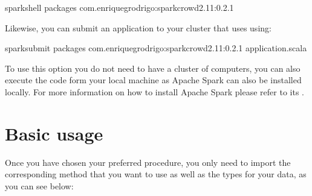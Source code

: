 \documentclass[letterpaper,10pt,english]{sphinxmanual}
\begin{document}
%
\begin{sphinxVerbatim}[commandchars=\\\{\}]
spark\PYGZhy{}shell \PYGZhy{}\PYGZhy{}packages com.enriquegrodrigo:spark\PYGZhy{}crowd\PYGZus{}2.11:0.2.1
\end{sphinxVerbatim}

Likewise, you can submit an application to your cluster that uses  using:

%
\begin{sphinxVerbatim}[commandchars=\\\{\}]
spark\PYGZhy{}submit \PYGZhy{}\PYGZhy{}packages com.enriquegrodrigo:spark\PYGZhy{}crowd\PYGZus{}2.11:0.2.1 application.scala
\end{sphinxVerbatim}

To use this option you do not need to have a cluster of computers, you can also execute the code form
your local machine as Apache Spark can also be installed locally. For more information on how to install
Apache Spark please refer to its .


\section{Basic usage}
\label{\detokenize{usage/quickstart:basic-usage}}
Once you have chosen your preferred procedure, you only need to import the corresponding method
that you want to use as well as the types for your data, as you can see below:

%
\begin{sphinxVerbatim}[commandchars=\\\{\}]
 
 

   

   \PYG{o}{[}\PYG{o}{]}

   

   \PYG{o}{[}\PYG{o}{]}

   
\end{sphinxVerbatim}
\end{document}
